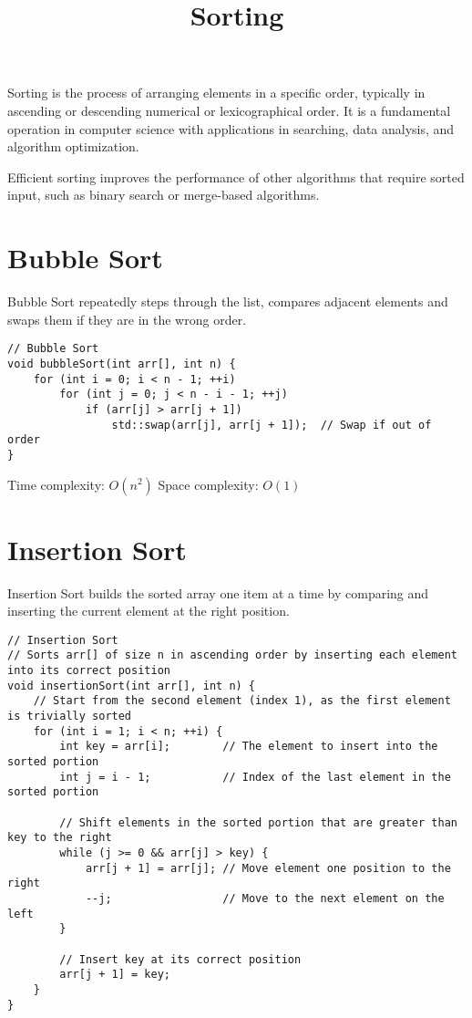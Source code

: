 \documentclass{article}
\title{Sorting}
\author{}
\date{}
\begin{document}
\maketitle



Sorting is the process of arranging elements in a specific order, typically in ascending or descending numerical or lexicographical order. It is a fundamental operation in computer science with applications in searching, data analysis, and algorithm optimization.

Efficient sorting improves the performance of other algorithms that require sorted input, such as binary search or merge-based algorithms. 

\section{Bubble Sort}
Bubble Sort repeatedly steps through the list, compares adjacent elements and swaps them if they are in the wrong order.

\begin{lstlisting}[style=cppstyle]
// Bubble Sort
void bubbleSort(int arr[], int n) {
    for (int i = 0; i < n - 1; ++i)
        for (int j = 0; j < n - i - 1; ++j)
            if (arr[j] > arr[j + 1])
                std::swap(arr[j], arr[j + 1]);  // Swap if out of order
}
\end{lstlisting}

Time complexity: $O(n^2)$
Space complexity: $O(1)$

\section{Insertion Sort}
Insertion Sort builds the sorted array one item at a time by comparing and inserting the current element at the right position.

\begin{lstlisting}[style=cppstyle]
// Insertion Sort
// Sorts arr[] of size n in ascending order by inserting each element into its correct position
void insertionSort(int arr[], int n) {
    // Start from the second element (index 1), as the first element is trivially sorted
    for (int i = 1; i < n; ++i) {
        int key = arr[i];        // The element to insert into the sorted portion
        int j = i - 1;           // Index of the last element in the sorted portion

        // Shift elements in the sorted portion that are greater than key to the right
        while (j >= 0 && arr[j] > key) {
            arr[j + 1] = arr[j]; // Move element one position to the right
            --j;                 // Move to the next element on the left
        }

        // Insert key at its correct position
        arr[j + 1] = key;
    }
}
\end{lstlisting}
\end{document}
